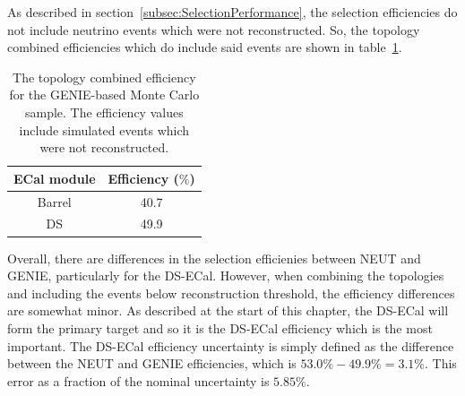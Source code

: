 As described in section~\ref{subsec:SelectionPerformance}, the selection efficiencies do not include neutrino events which were not reconstructed.  So, the topology combined efficiencies which do include said events are shown in table~\ref{table:FinalEffGENIE}.
\begin{table}
  \begin{tabular}{ c c }
    ECal module & Efficiency ($\%$) \\ \hline \hline
    Barrel & 40.7 \\
    DS & 49.9  \\
  \end{tabular}
  \caption{The topology combined efficiency for the GENIE-based Monte Carlo sample.  The efficiency values include simulated events which were not reconstructed.}
  \label{table:FinalEffGENIE}
\end{table}
Overall, there are differences in the selection efficienies between NEUT and GENIE, particularly for the DS-ECal.  However, when combining the topologies and including the events below reconstruction threshold, the efficiency differences are somewhat minor.  As described at the start of this chapter, the DS-ECal will form the primary target and so it is the DS-ECal efficiency which is the most important.  The DS-ECal efficiency uncertainty is simply defined as the difference between the NEUT and GENIE efficiencies, which is $53.0\% - 49.9\% = 3.1\%$.  This error as a fraction of the nominal uncertainty is $5.85\%$.

